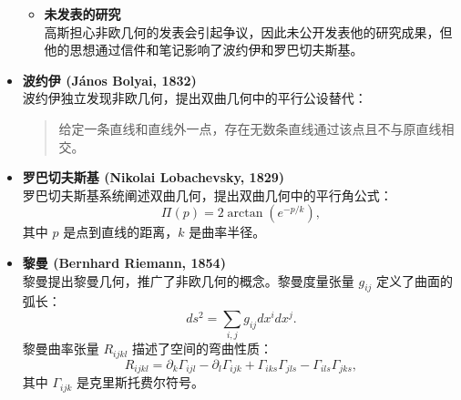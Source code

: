 \documentclass[12pt, a4paper, oneside, UTF8]{ctexbook}  %
\begin{document}
\begin{add}
\begin{itemize}
\begin{itemize}
            \item \textbf{未发表的研究} \\
            高斯担心非欧几何的发表会引起争议，因此未公开发表他的研究成果，但他的思想通过信件和笔记影响了波约伊和罗巴切夫斯基。
        \end{itemize}
    
        \item \textbf{波约伊 (János Bolyai, 1832)} \\
        波约伊独立发现非欧几何，提出双曲几何中的平行公设替代：
        \begin{quote}
            给定一条直线和直线外一点，存在无数条直线通过该点且不与原直线相交。
        \end{quote}
    
        \item \textbf{罗巴切夫斯基 (Nikolai Lobachevsky, 1829)} \\
        罗巴切夫斯基系统阐述双曲几何，提出双曲几何中的平行角公式：
        \[
        \Pi(p) = 2 \arctan(e^{-p/k}),
        \]
        其中 \( p \) 是点到直线的距离，\( k \) 是曲率半径。
    
        \item \textbf{黎曼 (Bernhard Riemann, 1854)} \\
        黎曼提出黎曼几何，推广了非欧几何的概念。黎曼度量张量 \( g_{ij} \) 定义了曲面的弧长：
        \[
        ds^2 = \sum_{i,j} g_{ij} dx^i dx^j.
        \]
        黎曼曲率张量 \( R_{ijkl} \) 描述了空间的弯曲性质：
        \[
        R_{ijkl} = \partial_k \Gamma_{ijl} - \partial_l \Gamma_{ijk} + \Gamma_{iks} \Gamma_{jls} - \Gamma_{ils} \Gamma_{jks},
        \]
        其中 \( \Gamma_{ijk} \) 是克里斯托费尔符号。
    \end{itemize}
\end{add}
\end{document}
